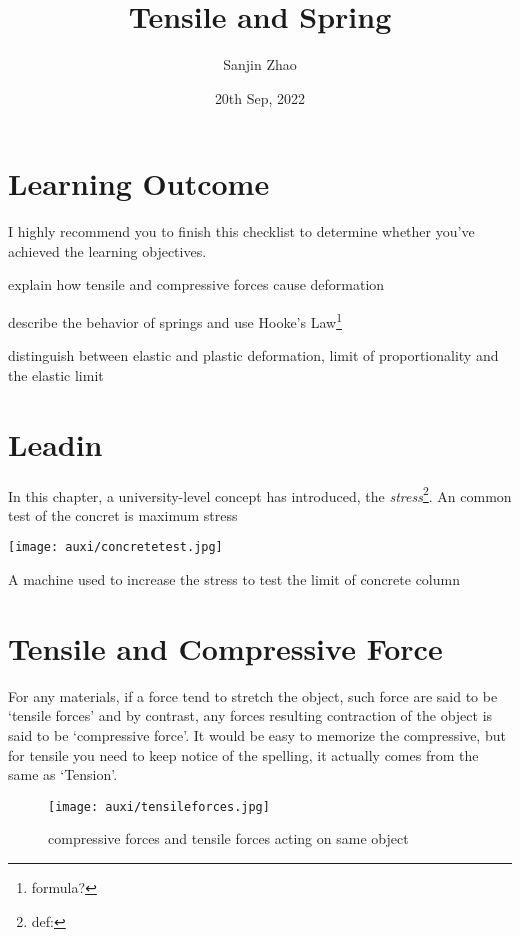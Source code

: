 \documentclass[a4paper]{tufte-handout}
\title{Tensile and Spring}
\author{Sanjin Zhao}
\date{20th Sep, 2022}  %
\begin{document}
\maketitle%
\section*{Learning Outcome}
I highly recommend you to finish this checklist to determine whether you've achieved the learning objectives.
\begin{todolist}
  \item explain how tensile and compressive forces cause deformation
  \item describe the behavior of springs and use Hooke's Law\footnote{formula?}
  \item distinguish between elastic and plastic deformation, limit of proportionality and the elastic limit
\end{todolist}
\clearpage

\section{Leadin}
In this chapter, a university-level concept has introduced, the \emph{stress}\footnote{def:}. An common test of the concret is maximum stress
\begin{marginfigure}
\texttt{[image: auxi/concretetest.jpg]}
\caption{A machine used to increase the stress to test the limit of concrete column}
\end{marginfigure}

\section{Tensile and Compressive Force}
For any materials, if a force tend to stretch the object, such force are said to be `tensile forces' and by contrast, any forces resulting contraction of the object is said to be `compressive force'. It would be easy to memorize the compressive, but for tensile you need to keep notice of the spelling, it actually comes from the same as `Tension'.
\begin{figure}
\centering
\texttt{[image: auxi/tensileforces.jpg]}
\caption{compressive forces and tensile forces acting on same object}
\end{figure}
\end{document}
